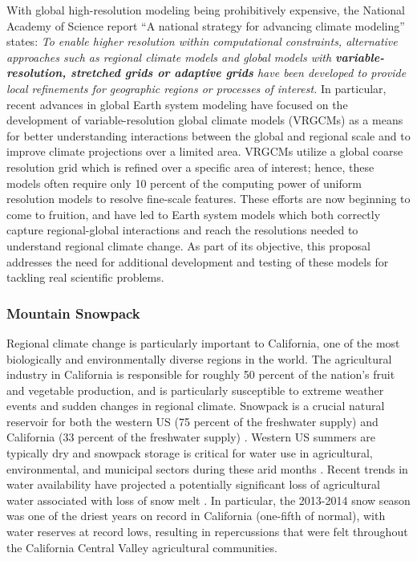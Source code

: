 \documentclass[11pt]{article}
\begin{document}
With global high-resolution modeling being prohibitively expensive, the National Academy of Science report ``A national strategy for advancing climate modeling'' states: \textit{To enable higher resolution within computational constraints, alternative approaches such as regional climate models and global models with \textbf{variable-resolution, stretched grids or adaptive grids} have been developed to provide local refinements for geographic regions or processes of interest.}  In particular, recent advances in global Earth system modeling have focused on the development of variable-resolution global climate models (VRGCMs) as a means for better understanding interactions between the global and regional scale and to improve climate projections over a limited area.  VRGCMs utilize a global coarse resolution grid which is refined over a specific area of interest; hence, these models often require only 10 percent of the computing power of uniform resolution models to resolve fine-scale features. These efforts are now beginning to come to fruition, and have led to Earth system models which both correctly capture regional-global interactions and reach the resolutions needed to understand regional climate change.   As part of its objective, this proposal addresses the need for additional development and testing of these models for tackling real scientific problems.

\subsubsection{Mountain Snowpack}

Regional climate change is particularly important to California, one of the most biologically and environmentally diverse regions in the world. The agricultural industry in California is responsible for roughly 50 percent of the nation's fruit and vegetable production, and is particularly susceptible to extreme weather events and sudden changes in regional climate.  Snowpack is a crucial natural reservoir for both the western US (75 percent of the freshwater supply) and California (33 percent of the freshwater supply) \citep{cayan1996interannual}.  Western US summers are typically dry and snowpack storage is critical for water use in agricultural, environmental, and municipal sectors during these arid months \citep{dettinger1995large, mote_declining_2005, maurer2007detection}.  Recent trends in water availability have projected a potentially significant loss of agricultural water associated with loss of snow melt \citep{dyer2006spatial}. In particular, the 2013-2014 snow season was one of the driest years on record in California (one-fifth of normal), with water reserves at record lows, resulting in repercussions that were felt throughout the California Central Valley agricultural communities.
\end{document}
